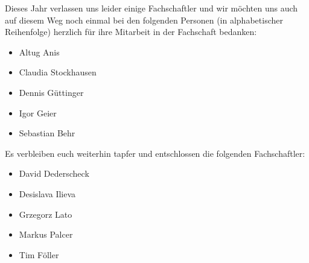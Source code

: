\spaltenende
Dieses Jahr verlassen uns leider einige Fachschaftler und wir möchten uns auch auf diesem Weg noch einmal bei den folgenden Personen (in alphabetischer Reihenfolge) herzlich für ihre Mitarbeit in der Fachschaft bedanken:

\begin{itemize}
\item Altug Anis
\item Claudia Stockhausen
\item Dennis Güttinger
\item Igor Geier
\item Sebastian Behr
\end{itemize}

Es verbleiben euch weiterhin tapfer und entschlossen die folgenden Fachschaftler:

\begin{itemize}
\item David Dederscheck
\item Desislava Ilieva
\item Grzegorz Lato
\item Markus Palcer
\item Tim Föller
\end{itemize}
\spaltenanfang
